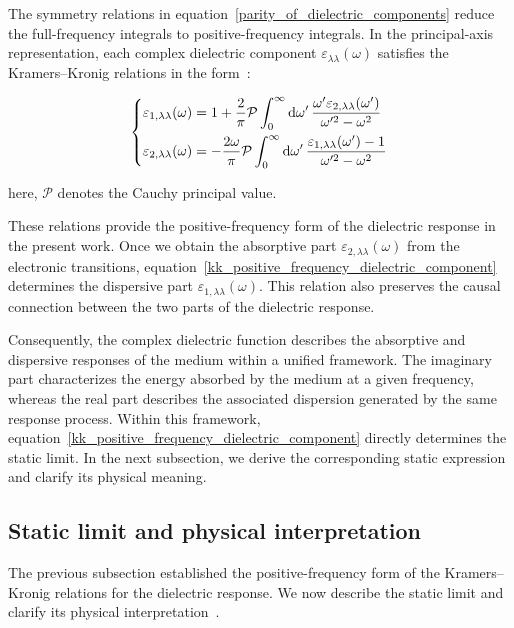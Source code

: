 The symmetry relations in equation~\eqref{parity_of_dielectric_components} reduce the full-frequency integrals to positive-frequency integrals.
In the principal-axis representation,
each complex dielectric component $\varepsilon_{\lambda\lambda}(\omega)$ satisfies the Kramers--Kronig relations in the form~\cite{ossikovski2021constitutive}:

\begin{equation}
\left\{\begin{aligned}
    \varepsilon_{1,\lambda\lambda}(\omega) &=
    1+\frac{2}{\mathrm{\pi}}\mathcal{P}
    \int_{0}^{\infty}\mathrm{d}{\omega'}\,
    \frac{\omega'\varepsilon_{2,\lambda\lambda}(\omega')}{\omega'^2-\omega^2} \\
    \varepsilon_{2,\lambda\lambda}(\omega) &=
    -\frac{2\omega}{\mathrm{\pi}}\mathcal{P}
    \int_{0}^{\infty}\mathrm{d}{\omega'}\,
    \frac{\varepsilon_{1,\lambda\lambda}(\omega')-1}{\omega'^2-\omega^2}  
\end{aligned}\right.
\label{kk_positive_frequency_dielectric_component}
\end{equation}

here, $\mathcal{P}$ denotes the Cauchy principal value.

These relations provide the positive-frequency form of the dielectric response in the present work.
Once we obtain the absorptive part $\varepsilon_{2,\lambda\lambda}(\omega)$ from the electronic transitions,
equation~\eqref{kk_positive_frequency_dielectric_component} determines the dispersive part $\varepsilon_{1,\lambda\lambda}(\omega)$.
This relation also preserves the causal connection between the two parts of the dielectric response.

Consequently, the complex dielectric function describes the absorptive
and dispersive responses of the medium within a unified framework.
The imaginary part characterizes the energy absorbed by the medium at a given frequency,
whereas the real part describes the associated dispersion generated by the same response process.
Within this framework, equation~\eqref{kk_positive_frequency_dielectric_component} directly determines the static limit.
In the next subsection, we derive the corresponding static expression and clarify its physical meaning.

\subsection{Static limit and physical interpretation}

The previous subsection established the positive-frequency form of the Kramers--Kronig relations for the dielectric response.
We now describe the static limit and clarify its physical interpretation~\cite{onishi2024universal,vandenberghe2023two}.


